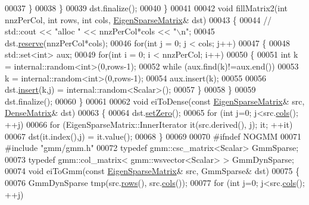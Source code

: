 \begin{DoxyCode}
00037     \}
00038   \}
00039   dst.finalize();
00040 \}
00041 
00042 \textcolor{keywordtype}{void} fillMatrix2(\textcolor{keywordtype}{int} nnzPerCol, \textcolor{keywordtype}{int} rows, \textcolor{keywordtype}{int} cols,  \hyperlink{group___sparse_core___module}{EigenSparseMatrix}& dst)
00043 \{
00044 \textcolor{comment}{//   std::cout << "alloc " << nnzPerCol*cols << "\(\backslash\)n";}
00045   dst.\hyperlink{group___sparse_core___module_a1518e58ac49bed0e2385b722a034f7d3}{reserve}(nnzPerCol*cols);
00046   \textcolor{keywordflow}{for}(\textcolor{keywordtype}{int} j = 0; j < cols; j++)
00047   \{
00048     std::set<int> aux;
00049     \textcolor{keywordflow}{for}(\textcolor{keywordtype}{int} i = 0; i < nnzPerCol; i++)
00050     \{
00051       \textcolor{keywordtype}{int} k = internal::random<int>(0,rows-1);
00052       \textcolor{keywordflow}{while} (aux.find(k)!=aux.end())
00053         k = internal::random<int>(0,rows-1);
00054       aux.insert(k);
00055 
00056       dst.\hyperlink{group___sparse_core___module_aae45e3b5fec7f6a0cdd10eec7c6d3666}{insert}(k,j) = internal::random<Scalar>();
00057     \}
00058   \}
00059   dst.finalize();
00060 \}
00061 
00062 \textcolor{keywordtype}{void} eiToDense(\textcolor{keyword}{const} \hyperlink{group___sparse_core___module}{EigenSparseMatrix}& src, \hyperlink{group___core___module_class_eigen_1_1_matrix}{DenseMatrix}& dst)
00063 \{
00064   dst.\hyperlink{class_eigen_1_1_plain_object_base_ac21ad5f989f320e46958b75ac8d9a1da}{setZero}();
00065   \textcolor{keywordflow}{for} (\textcolor{keywordtype}{int} j=0; j<src.\hyperlink{group___sparse_core___module_aa391750e3c530227e4a5c3c52e959975}{cols}(); ++j)
00066     \textcolor{keywordflow}{for} (EigenSparseMatrix::InnerIterator it(src.derived(), j); it; ++it)
00067       dst(it.index(),j) = it.value();
00068 \}
00069 
00070 \textcolor{preprocessor}{#ifndef NOGMM}
00071 \textcolor{preprocessor}{#include "gmm/gmm.h"}
00072 \textcolor{keyword}{typedef} gmm::csc\_matrix<Scalar> GmmSparse;
00073 \textcolor{keyword}{typedef} gmm::col\_matrix< gmm::wsvector<Scalar> > GmmDynSparse;
00074 \textcolor{keywordtype}{void} eiToGmm(\textcolor{keyword}{const} \hyperlink{group___sparse_core___module}{EigenSparseMatrix}& src, GmmSparse& dst)
00075 \{
00076   GmmDynSparse tmp(src.\hyperlink{group___sparse_core___module_a62e61bb861eee306d5b069ce652b5aa5}{rows}(), src.\hyperlink{group___sparse_core___module_aa391750e3c530227e4a5c3c52e959975}{cols}());
00077   \textcolor{keywordflow}{for} (\textcolor{keywordtype}{int} j=0; j<src.\hyperlink{group___sparse_core___module_aa391750e3c530227e4a5c3c52e959975}{cols}(); ++j)

\end{DoxyCode}
